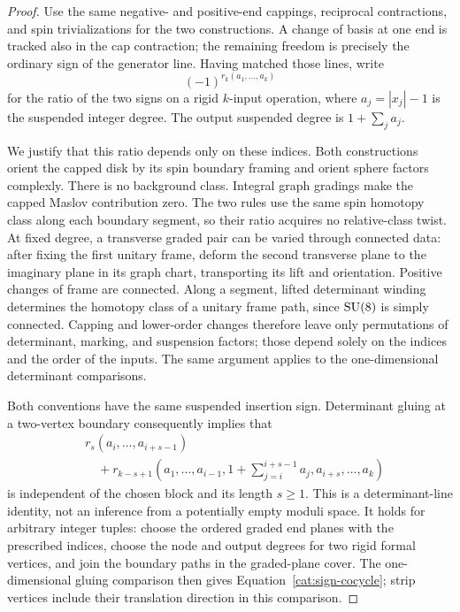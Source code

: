 \begin{proof}
Use the same negative- and positive-end cappings, reciprocal
contractions, and spin trivializations for the two constructions.
A change of basis at one end is tracked also in the cap contraction;
the remaining freedom is precisely the ordinary sign of the generator
line.  Having matched those lines, write
\[
 (-1)^{r_k(a_1,\ldots,a_k)}
\]
for the ratio of the two signs on a rigid \(k\)-input operation, where
\(a_j=|x_j|-1\) is the suspended integer degree.
The output suspended degree is \(1+\sum_j a_j\).

We justify that this ratio depends only on these indices.
Both constructions orient the capped disk by its spin boundary
framing and orient sphere factors complexly.  There is no background
class.  Integral graph gradings make the capped Maslov contribution
zero.  The two rules use the same spin homotopy class along each
boundary segment, so their ratio acquires no relative-class twist.
At fixed degree, a transverse graded pair can be varied through
connected data: after fixing the first unitary frame, deform the
second transverse plane to the imaginary plane in its graph chart,
transporting its lift and orientation.  Positive changes of frame
are connected.  Along a segment, lifted determinant winding determines
the homotopy class of a unitary frame path, since \(\operatorname{SU}(8)\) is simply
connected.  Capping and lower-order changes therefore leave only
permutations of determinant, marking, and suspension factors; those
depend solely on the indices and the order of the inputs.
The same argument applies to the one-dimensional determinant
comparisons.

Both conventions have the same suspended insertion sign.
Determinant gluing at a two-vertex boundary consequently implies that
\begin{equation}\label{cat:sign-cocycle}
 \begin{split}
 &r_s(a_i,\ldots,a_{i+s-1})\\
 &\quad+
 r_{k-s+1}\left(a_1,\ldots,a_{i-1},
         1+\sum_{j=i}^{i+s-1}a_j,
         a_{i+s},\ldots,a_k\right)
 \end{split}
\end{equation}
is independent of the chosen block and its length \(s\ge1\).
This is a determinant-line identity, not an inference from a
potentially empty moduli space.  It holds for arbitrary integer
tuples: choose the ordered graded end planes with the prescribed
indices, choose the node and output degrees for two rigid formal
vertices, and join the boundary paths in the graded-plane cover.
The one-dimensional gluing comparison then gives
Equation~\eqref{cat:sign-cocycle}; strip vertices include their
translation direction in this comparison.


\end{proof}
